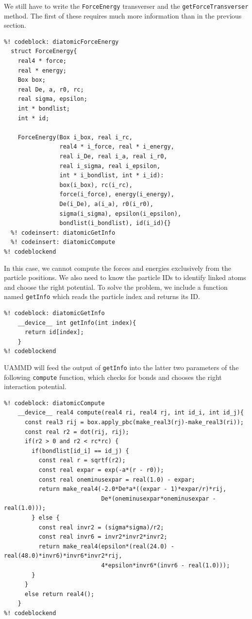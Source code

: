 We still have to write the \texttt{ForceEnergy} transverser and the 
\texttt{getForceTransverser} method. The first of these requires much more 
information than in the previous section.
\begin{lstlisting}
%! codeblock: diatomicForceEnergy
  struct ForceEnergy{
    real4 * force;
    real * energy;
    Box box;
    real De, a, r0, rc;
    real sigma, epsilon;
    int * bondlist;
    int * id;

    ForceEnergy(Box i_box, real i_rc,
                real4 * i_force, real * i_energy,
                real i_De, real i_a, real i_r0,
                real i_sigma, real i_epsilon,
                int * i_bondlist, int * i_id):
                box(i_box), rc(i_rc),
                force(i_force), energy(i_energy),
                De(i_De), a(i_a), r0(i_r0),
                sigma(i_sigma), epsilon(i_epsilon),
                bondlist(i_bondlist), id(i_id){}
  %! codeinsert: diatomicGetInfo
  %! codeinsert: diatomicCompute
%! codeblockend
\end{lstlisting}
In this case, we cannot compute the forces and energies exclusively from the 
particle positions. We also need to know the particle IDs to identify linked
atoms and choose the right potential. To solve the problem, we include a 
function named \texttt{getInfo} which reads the particle index and returns its 
ID.
\begin{lstlisting}
%! codeblock: diatomicGetInfo
    __device__ int getInfo(int index){
      return id[index];
    }
%! codeblockend
\end{lstlisting}
UAMMD will feed the output of \texttt{getInfo} into the latter two parameters of 
the following \texttt{compute} function, which checks for bonds and chooses the 
right interaction potential.
\begin{lstlisting}
%! codeblock: diatomicCompute
    __device__ real4 compute(real4 ri, real4 rj, int id_i, int id_j){
      const real3 rij = box.apply_pbc(make_real3(rj)-make_real3(ri));
      const real r2 = dot(rij, rij);
      if(r2 > 0 and r2 < rc*rc) {
        if(bondlist[id_i] == id_j) {
          const real r = sqrtf(r2);
          const real expar = exp(-a*(r - r0));
          const real oneminusexpar = real(1.0) - expar;
          return make_real4(-2.0*De*a*((expar - 1)*expar/r)*rij,
                            De*(oneminusexpar*oneminusexpar - real(1.0)));
        } else {
          const real invr2 = (sigma*sigma)/r2;
          const real invr6 = invr2*invr2*invr2;
          return make_real4(epsilon*(real(24.0) - real(48.0)*invr6)*invr6*invr2*rij,
                            4*epsilon*invr6*(invr6 - real(1.0)));
        }
      }
      else return real4();
    }
%! codeblockend
\end{lstlisting}
